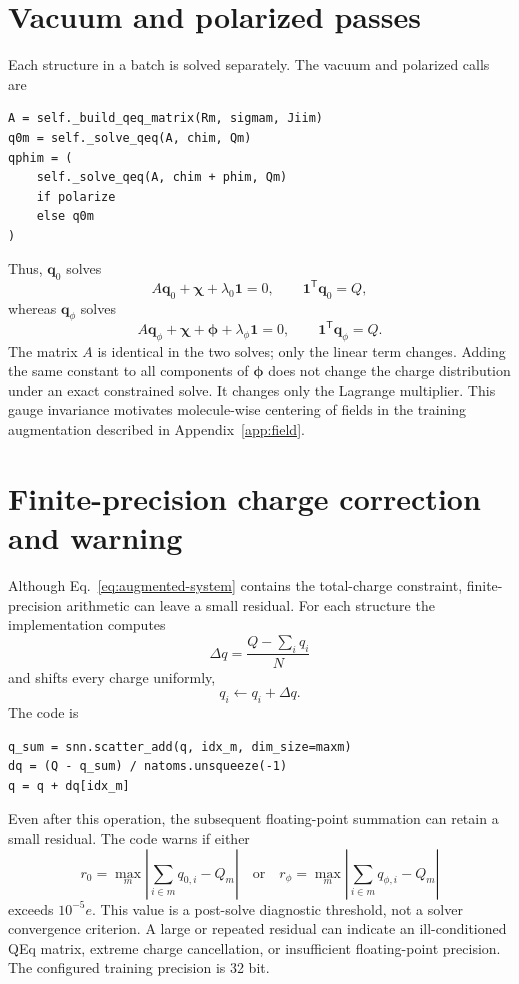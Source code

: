\documentclass[11pt,a4paper]{article}
\newcommand{\vect}[1]{\bm{#1}}
\newcommand{\ones}{\vect{1}}
\begin{document}
\section{Vacuum and polarized passes}

Each structure in a batch is solved separately.  The vacuum and polarized calls
are
\begin{lstlisting}[style=pythonstyle]
A = self._build_qeq_matrix(Rm, sigmam, Jiim)
q0m = self._solve_qeq(A, chim, Qm)
qphim = (
    self._solve_qeq(A, chim + phim, Qm)
    if polarize
    else q0m
)
\end{lstlisting}
Thus, $\vect q_0$ solves
\begin{equation}
  A\vect q_0+\vect\chi+\lambda_0\ones=0,
  \qquad \ones^{\mathsf T}\vect q_0=Q,
\end{equation}
whereas $\vect q_\phi$ solves
\begin{equation}
  A\vect q_\phi+\vect\chi+\vect\phi+\lambda_\phi\ones=0,
  \qquad \ones^{\mathsf T}\vect q_\phi=Q.
\end{equation}
The matrix $A$ is identical in the two solves; only the linear term changes.
Adding the same constant to all components of $\vect\phi$ does not change the
charge distribution under an exact constrained solve.  It changes only the
Lagrange multiplier.  This gauge invariance motivates molecule-wise centering
of fields in the training augmentation described in Appendix~\ref{app:field}.

\section{Finite-precision charge correction and warning}

Although Eq.~\eqref{eq:augmented-system} contains the total-charge constraint,
finite-precision arithmetic can leave a small residual.  For each structure the
implementation computes
\begin{equation}
  \Delta q=\frac{Q-\sum_iq_i}{N}
\end{equation}
and shifts every charge uniformly,
\begin{equation}
  q_i\leftarrow q_i+\Delta q.
\end{equation}
The code is
\begin{lstlisting}[style=pythonstyle]
q_sum = snn.scatter_add(q, idx_m, dim_size=maxm)
dq = (Q - q_sum) / natoms.unsqueeze(-1)
q = q + dq[idx_m]
\end{lstlisting}
Even after this operation, the subsequent floating-point summation can retain a
small residual.  The code warns if either
\begin{equation}
  r_0=\max_m\left|\sum_{i\in m}q_{0,i}-Q_m\right|
  \quad\text{or}\quad
  r_\phi=\max_m\left|\sum_{i\in m}q_{\phi,i}-Q_m\right|
\end{equation}
exceeds $10^{-5}e$.  This value is a post-solve diagnostic threshold, not a
solver convergence criterion.  A large or repeated residual can indicate an
ill-conditioned QEq matrix, extreme charge cancellation, or insufficient
floating-point precision.  The configured training precision is 32 bit.
\end{document}

